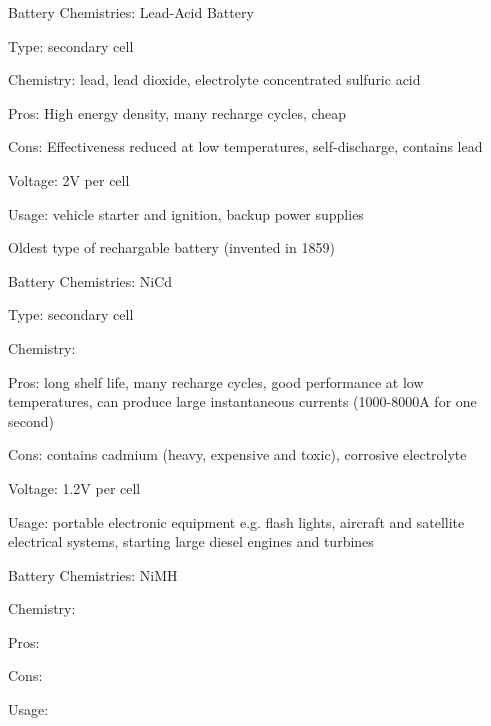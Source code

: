 \documentclass[12pt,t]{beamer}
\begin{document}
\begin{frame}[c]{Battery Chemistries: Lead-Acid Battery }
\bbi   
\item Type: secondary cell
\item Chemistry: lead, lead dioxide, electrolyte concentrated sulfuric acid
\item Pros: High energy density, many recharge cycles, cheap
\item Cons: Effectiveness reduced at low temperatures, self-discharge, contains lead 
\item Voltage: 2V per cell
\item Usage: vehicle starter and ignition, backup power supplies
\item Oldest type of rechargable battery (invented in 1859)
\ei     
\end{frame}

\begin{frame}[c]{Battery Chemistries: NiCd }
\bbi   
\item Type: secondary cell
\item Chemistry: 
\item Pros: long shelf life, many recharge cycles, good performance at low temperatures, can produce large instantaneous currents (1000-8000A for one second)
\item Cons: contains cadmium (heavy, expensive and toxic), corrosive electrolyte
\item Voltage: 1.2V per cell
\item Usage: portable electronic equipment e.g. flash lights, aircraft and satellite electrical systems, starting large diesel engines and turbines
\ei     
\end{frame}

\begin{frame}[c]{Battery Chemistries: NiMH }
\bbi    
\item Chemistry:
\item Pros:     
\item Cons:
\item Usage:
\ei     
\end{frame}
\end{document}
